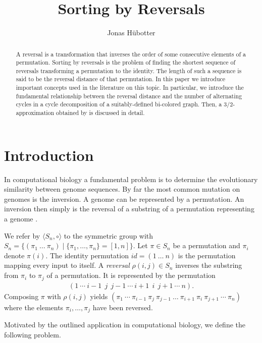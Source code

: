 \documentclass[11pt,DIV=11]{scrartcl}
\title{Sorting by Reversals}
\author{Jonas Hübotter}
\theoremstyle{definition}
\theoremstyle{remark}
\begin{document}
\maketitle

\begin{abstract}
    A reversal is a transformation that inverses the order of some consecutive elements of a permutation. Sorting by reversals is the problem of finding the shortest sequence of reversals transforming a permutation to the identity. The length of such a sequence is said to be the reversal distance of that permutation. In this paper we introduce important concepts used in the literature on this topic. In particular, we introduce the fundamental relationship between the reversal distance and the number of alternating cycles in a cycle decomposition of a suitably-defined bi-colored graph. Then, a $3/2$-approximation obtained by \citeauthor*{Christie1998} is discussed in detail.
\end{abstract}

\section{Introduction}

In computational biology a fundamental problem is to determine the evolutionary similarity between genome sequences. By far the most common mutation on genomes is the inversion. A genome can be represented by a permutation. An inversion then simply is the reversal of a substring of a permutation representing a genome \cite{Kececioglu1995}.

We refer by $\langle S_n, \circ \rangle$ to the symmetric group with $S_n = \{(\pi_1\ \dots\ \pi_n) \mid \{\pi_1, \dots, \pi_n\} = [1,n]\}$. Let $\pi \in S_n$ be a permutation and $\pi_i$ denote $\pi(i)$. The identity permutation $id = (1\ \dots\ n)$ is the permutation mapping every input to itself. A \textit{reversal} $\rho(i,j) \in S_n$ inverses the substring from $\pi_i$ to $\pi_j$ of a permutation. It is represented by the permutation
\begin{align*}
    (1\ \cdots\ i-1\ \ j\ \ j-1\ \cdots\ i+1\ \ i\ \ j+1\ \cdots\ n).
\end{align*}
Composing $\pi$ with $\rho(i,j)$ yields $(\pi_1\ \cdots\ \pi_{i-1}\ \pi_j\ \pi_{j-1}\ \dots\ \pi_{i+1}\ \pi_i\ \pi_{j+1}\ \cdots\ \pi_n)$ where the elements $\pi_i, \dots, \pi_j$ have been reversed.

Motivated by the outlined application in computational biology, we define the following problem.
\end{document}
